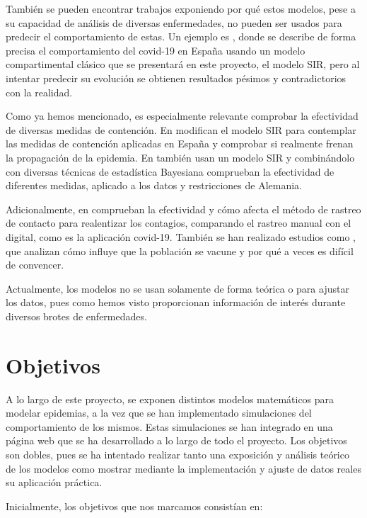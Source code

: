 También se pueden encontrar trabajos exponiendo por qué estos modelos, pese a su capacidad de análisis de diversas enfermedades, no pueden ser usados para predecir el comportamiento de estas. Un ejemplo es \cite{turningpoint}, donde se describe de forma precisa el comportamiento del covid-19 en España usando un modelo compartimental clásico que se presentará en este proyecto, el modelo SIR, pero al intentar predecir su evolución se obtienen resultados pésimos y contradictorios con la realidad.

Como ya hemos mencionado, es especialmente relevante comprobar la efectividad de diversas medidas de contención. En \cite{gutierrez2020analisis} modifican el modelo SIR para contemplar las medidas de contención aplicadas en España y comprobar si realmente frenan la propagación de la epidemia. En \cite{inferringinterventions} también usan un modelo SIR y combinándolo con diversas técnicas de estadística Bayesiana comprueban la efectividad de diferentes medidas, aplicado a los datos y restricciones de Alemania.

Adicionalmente, en \cite{Mancastroppa2021} comprueban la efectividad y cómo afecta el método de rastreo de contacto para realentizar los contagios, comparando el rastreo manual con el digital, como es la aplicación covid-19. También se han realizado estudios como \cite{vaccinationproblem}, que analizan cómo influye que la población se vacune y por qué a veces es difícil de convencer.

Actualmente, los modelos no se usan solamente de forma teórica o para ajustar los datos, pues como hemos visto proporcionan información de interés durante diversos brotes de enfermedades.


\section{Objetivos}

A lo largo de este proyecto, se exponen distintos modelos matemáticos para modelar epidemias, a la vez que se han implementado simulaciones del comportamiento de los mismos. Estas simulaciones se han integrado en una página web que se ha desarrollado a lo largo de todo el proyecto. Los objetivos son dobles, pues se ha intentado realizar tanto una exposición y análisis teórico de los modelos como mostrar mediante la implementación y ajuste de datos reales su aplicación práctica.

Inicialmente, los objetivos que nos marcamos consistían en:

